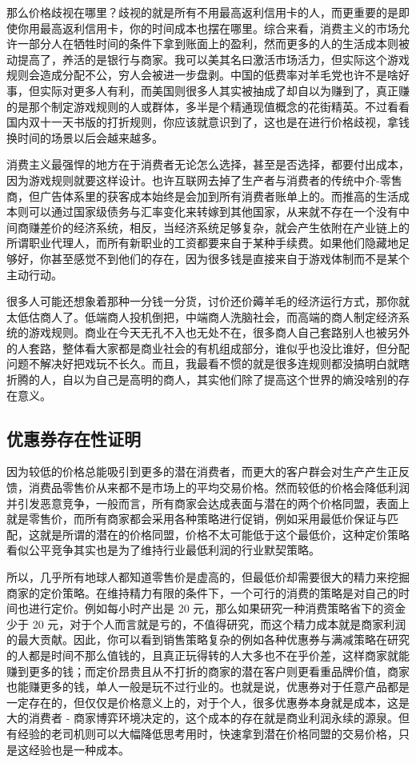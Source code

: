 \documentclass[
  letterpaper,
  DIV=11,
  numbers=noendperiod]{scrreprt}
\begin{document}
那么价格歧视在哪里？歧视的就是所有不用最高返利信用卡的人，而更重要的是即使你用最高返利信用卡，你的时间成本也摆在哪里。综合来看，消费主义的市场允许一部分人在牺牲时间的条件下拿到账面上的盈利，然而更多的人的生活成本则被动提高了，养活的是银行与商家。我可以美其名曰激活市场活力，但实际这个游戏规则会造成分配不公，穷人会被进一步盘剥。中国的低费率对羊毛党也许不是啥好事，但实际对更多人有利，而美国则很多人其实被抽成了却自以为赚到了，真正赚的是那个制定游戏规则的人或群体，多半是个精通现值概念的花街精英。不过看看国内双十一天书版的打折规则，你应该就意识到了，这也是在进行价格歧视，拿钱换时间的场景以后会越来越多。

消费主义最强悍的地方在于消费者无论怎么选择，甚至是否选择，都要付出成本，因为游戏规则就要这样设计。也许互联网去掉了生产者与消费者的传统中介-零售商，但广告体系里的获客成本始终是会加到所有消费者账单上的。而推高的生活成本则可以通过国家级债务与汇率变化来转嫁到其他国家，从来就不存在一个没有中间商赚差价的经济系统，相反，当经济系统足够复杂，就会产生依附在产业链上的所谓职业代理人，而所有新职业的工资都要来自于某种手续费。如果他们隐藏地足够好，你甚至感觉不到他们的存在，因为很多钱是直接来自于游戏体制而不是某个主动行动。

很多人可能还想象着那种一分钱一分货，讨价还价薅羊毛的经济运行方式，那你就太低估商人了。低端商人投机倒把，中端商人洗脑社会，而高端的商人制定经济系统的游戏规则。商业在今天无孔不入也无处不在，很多商人自己套路别人也被另外的人套路，整体看大家都是商业社会的有机组成部分，谁似乎也没比谁好，但分配问题不解决好把戏玩不长久。而且，我最看不惯的就是很多连规则都没搞明白就瞎折腾的人，自以为自己是高明的商人，其实他们除了提高这个世界的熵没啥别的存在意义。

\subsection{优惠券存在性证明}\label{ux4f18ux60e0ux5238ux5b58ux5728ux6027ux8bc1ux660e}

因为较低的价格总能吸引到更多的潜在消费者，而更大的客户群会对生产产生正反馈，消费品零售价从来都不是市场上的平均交易价格。然而较低的价格会降低利润并引发恶意竞争，一般而言，所有商家会达成表面与潜在的两个价格同盟，表面上就是零售价，而所有商家都会采用各种策略进行促销，例如采用最低价保证与匹配，这就是所谓的潜在的价格同盟，价格不太可能低于这个最低价，这种定价策略看似公平竞争其实也是为了维持行业最低利润的行业默契策略。

所以，几乎所有地球人都知道零售价是虚高的，但最低价却需要很大的精力来挖掘商家的定价策略。在维持精力有限的条件下，一个可行的消费的策略是对自己的时间也进行定价。例如每小时产出是
20 元，那么如果研究一种消费策略省下的资金少于 20
元，对于个人而言就是亏的，不值得研究，而这个精力成本就是商家利润的最大贡献。因此，你可以看到销售策略复杂的例如各种优惠券与满减策略在研究的人都是时间不那么值钱的，且真正玩得转的人大多也不在乎价差，这样商家就能赚到更多的钱；而定价昂贵且从不打折的商家的潜在客户则更看重品牌价值，商家也能赚更多的钱，单人一般是玩不过行业的。也就是说，优惠券对于任意产品都是一定存在的，但仅仅是价格意义上的，对于个人，很多优惠券本身就是成本，这是大的消费者
-
商家博弈环境决定的，这个成本的存在就是商业利润永续的源泉。但有经验的老司机则可以大幅降低思考用时，快速拿到潜在价格同盟的交易价格，只是这经验也是一种成本。
\end{document}
